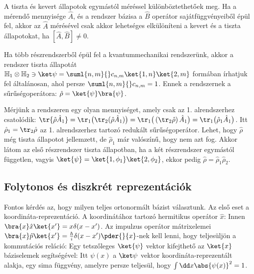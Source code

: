    A tiszta és kevert állapotok egymástól méréssel különböztethetőek meg.
   Ha a mérendő mennyisége $\hat{A}$, és a rendszer bázisa a $\hat B$ operátor sajátfüggvényeiből épül fel, akkor az $\hat A$ mérésével csak akkor lehetséges elkülöníteni a kevert és a tiszta állapotokat, ha $[\hat{A},\hat{B}]\neq 0$.
   
   Ha több részrendszerből épül fel a kvantummechanikai rendszerünk, akkor a rendszer tiszta állapotát $\mathbb{H}_1\otimes\mathbb{H}_2\ni\ket\psi=\suml{n,m}{}c_{n,m}\ket{1,n}\ket{2,m}$ formában írhatjuk fel általánosan, ahol persze $\suml{n,m}{}c_{n,m}=1$.
   Ennek a rendszernek a sűrűségoperátora: $\hat\rho= \ket{\psi}\bra{\psi}$.
   
   Mérjünk a rendszeren egy olyan mennyiséget, amely csak az 1. alrendszerhez csatolódik: $\tr{\hat\rho\hat A_1}=\tr_1{\big(\tr_2{(\hat\rho\hat A_1)}\big)}=\tr_1{\big(\left(\tr_2{\hat\rho}\right)\hat A_1\big)}= \tr_1\big(\hat\rho_1\hat A_1\big)$.
   Itt $\hat\rho_1=\tr_2\hat\rho$ az 1. alrendszerhez tartozó redukált sűrűségoperátor.
   Lehet, hogy $\hat\rho$ még tiszta állapotot jellemzett, de $\hat\rho_1$ már valószínű, hogy nem azt fog.
   Akkor látom az első részrendszer tiszta állapotban, ha a két részrendszer egymástól független, vagyis $\ket{\psi}=\ket{1,\phi_1}\ket{2,\phi_2}$, ekkor pedig $\hat\rho=\hat\rho_1\hat\rho_2$. 
   
  \subsection{Folytonos és diszkrét reprezentációk}
   
   Fontos kérdés az, hogy milyen teljes ortonormált bázist választunk.
   Az első eset a koordináta-reprezentáció.
   A koordinátához tartozó hermitikus operátor $\hat{x}$:
   Innen $\bra{x}\hat{x}\ket{x'}=x\delta (x-x')$.
   Az impulzus operátor mátrixelemei $\bra{x}\hat{p}\ket{x'}=\frac{\hbar}{i}\delta (x-x')\pder{}{x}$-nek kell lenni, hogy teljesüljön a kommutációs reláció:
   Egy tetszőleges $\ket{\psi}$ vektor kifejthető az $\ket{x}$ báziselemek segítségével:
   Itt $\psi(x)$ a $\ket\psi$ vektor koordináta-reprezentált alakja, egy sima függvény, amelyre persze teljesül, hogy $\int \dd x \abs{\psi(x)}^2=1$.
   
